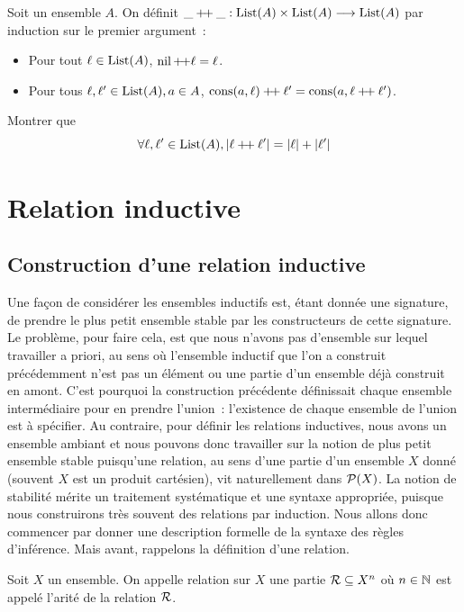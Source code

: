 \begin{exercise}
  Soit un ensemble $A$. On définit
  $\mathord{\_} \mathbin{\mathord{+}\!\mathord{+}} \mathord{\_} : \displaystyle \operatorname{List}(A) \times \operatorname{List}(A) \longrightarrow \operatorname{List}(A)$ par
  induction sur le premier argument~:
  \begin{itemize}
  \item Pour tout $\ell\in \operatorname{List}(A)$, $\operatorname{nil} \mathbin{\mathord{+}\!\mathord{+}} \ell = \ell$.
  \item Pour tous $\ell,\ell'\in\operatorname{List}(A), a\in A$,
    $\operatorname{cons}(a,\ell) \mathbin{\mathord{+}\!\mathord{+}} \ell' = \operatorname{cons}(a,\ell \mathbin{\mathord{+}\!\mathord{+}} \ell')$.
  \end{itemize}

  \noindent
  Montrer que
  \[\forall \ell,\ell'\in \operatorname{List}(A),
  |\ell\mathbin{\mathord{+}\!\mathord{+}} \ell'|=|\ell|+|\ell'|\]
\end{exercise}

\section{Relation inductive}

\subsection{Construction d'une relation inductive}

Une façon de considérer les ensembles inductifs est, étant donnée une signature,
de prendre le plus petit ensemble stable par les constructeurs de cette
signature. Le problème, pour faire cela, est que nous n'avons pas d'ensemble sur
lequel travailler a priori, au sens où l'ensemble inductif que l'on a construit
précédemment n'est pas un élément ou une partie d'un ensemble déjà construit en
amont. C'est pourquoi la construction précédente définissait chaque ensemble
intermédiaire pour en prendre l'union~: l'existence de chaque ensemble de
l'union est à spécifier. Au contraire, pour définir les relations inductives,
nous avons un ensemble ambiant et nous pouvons donc travailler sur la notion de
plus petit ensemble stable puisqu'une relation, au sens d'une partie d'un
ensemble $X$ donné (souvent $X$ est un produit cartésien), vit naturellement
dans $\mathcal{P}(X)$. La notion de stabilité mérite un traitement systématique et
une syntaxe appropriée, puisque nous construirons très souvent des relations par
induction. Nous allons donc commencer par donner une description formelle de la
syntaxe des règles d'inférence. Mais avant, rappelons la définition d'une
relation.

\begin{definition}[Relation]
  Soit $X$ un ensemble. On appelle relation sur $X$ une partie
  $\mathord{\mathrel{\mathcal{R}}}\subseteq X^n$ où $n\in\mathbb N$ est appelé l'arité de la
  relation $\mathrel{\mathcal{R}}$.
\end{definition}

